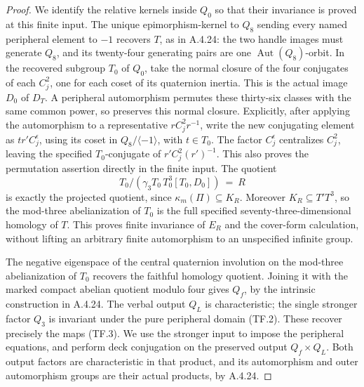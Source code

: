 \begin{proof}
We identify the relative kernels inside \(Q_0\) so that
their invariance is proved at this finite input.
The unique epimorphism-kernel to \(Q_8\) sending every
named peripheral element to \(-1\) recovers \(T\),
as in A.4.24: the two handle images must generate
\(Q_8\), and its twenty-four generating pairs are
one \(\operatorname{Aut}(Q_8)\)-orbit.
In the recovered subgroup \(T_0\) of \(Q_0\), take
the normal closure of the four conjugates of each
\(C_j^2\), one for each coset of its quaternion
inertia. This is the actual image \(D_0\) of \(D_T\).
A peripheral automorphism permutes these thirty-six
classes with the same common power, so preserves this
normal closure. Explicitly, after applying the
automorphism to a representative \(rC_j^2r^{-1}\),
write the new conjugating element as
\(t r' C_j^\epsilon\), using its coset in
\(Q_8/\langle-1\rangle\), with \(t\in T_0\).
The factor \(C_j^\epsilon\) centralizes \(C_j^2\),
leaving the specified \(T_0\)-conjugate of
\(r'C_j^2(r')^{-1}\). This also proves the permutation
assertion directly in the finite input. The quotient
\[
          T_0/(\gamma_3T_0\,T_0^3[T_0,D_0])
                       \ =\ R
 \tag{TF.12}
\]
is exactly the projected quotient, since
\(\kappa_m(\Pi)\subseteq K_R\).
Moreover \(K_R\subseteq T'T^3\), so the mod-three
abelianization of \(T_0\) is the full specified
seventy-three-dimensional homology of \(T\).
This proves finite invariance of \(E_R\) and the
cover-form calculation, without lifting an arbitrary
finite automorphism to an unspecified infinite group.

The negative eigenspace of the central quaternion
involution on the mod-three abelianization of \(T_0\)
recovers the faithful homology quotient. Joining it with
the marked compact abelian quotient modulo four gives
\(Q_f\), by the intrinsic construction in A.4.24.
The verbal output \(Q_L\) is characteristic; the
single stronger factor \(Q_3\) is invariant under the
pure peripheral domain (TF.2). These recover precisely
the maps (TF.3). We use the stronger input to impose
the peripheral equations, and perform deck conjugation
on the preserved output \(Q_f\times Q_L\).
Both output factors are characteristic in that product,
and its automorphism and outer automorphism groups
are their actual products, by A.4.24.


\end{proof}
